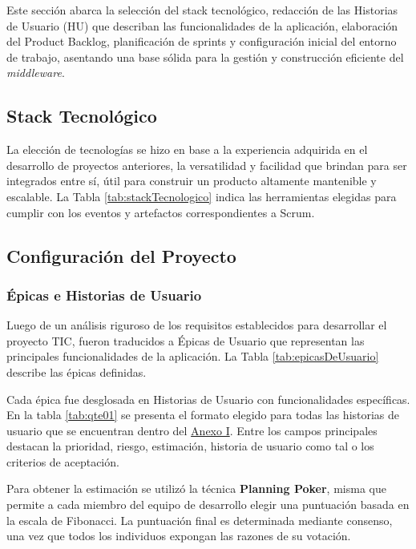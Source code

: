 Este sección abarca la selección del stack tecnológico, redacción de las Historias de Usuario (HU) que describan las funcionalidades de la aplicación, elaboración del Product Backlog, planificación de sprints y configuración inicial del entorno de trabajo, asentando una base sólida para la gestión y construcción eficiente del \textit{middleware}.


\subsection{Stack Tecnológico}
La elección de tecnologías se hizo en base a la experiencia adquirida en el desarrollo de proyectos anteriores, la versatilidad y facilidad que brindan para ser integrados entre sí, útil para construir un producto altamente mantenible y escalable. La Tabla \ref{tab:stackTecnologico} indica las herramientas elegidas para cumplir con los eventos y artefactos correspondientes a Scrum.



\subsection{Configuración del Proyecto}

\subsubsection{Épicas e Historias de Usuario}
Luego de un análisis riguroso de los requisitos establecidos para desarrollar el proyecto TIC, fueron traducidos a Épicas de Usuario que representan las principales funcionalidades de la aplicación. La Tabla \ref{tab:epicasDeUsuario} describe las épicas definidas.




Cada épica fue desglosada en Historias de Usuario con funcionalidades específicas. En la tabla \ref{tab:qte01} se presenta el formato elegido para todas las historias de usuario que se encuentran dentro del \hyperlink{anexoI}{Anexo I}. Entre los campos principales destacan la prioridad, riesgo, estimación, historia de usuario como tal o los criterios de aceptación.

Para obtener la estimación se utilizó la técnica \textbf{Planning Poker}, misma que permite a cada miembro del equipo de desarrollo elegir una puntuación basada en la escala de Fibonacci. La puntuación final es determinada mediante consenso, una vez que todos los individuos expongan las razones de su votación.

